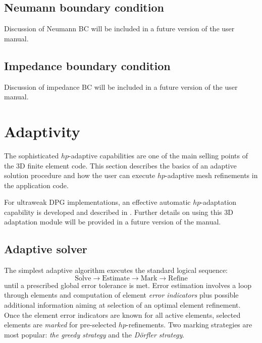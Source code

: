 \subsection{Neumann boundary condition}
\label{sec:impedance}

Discussion of Neumann BC will be included in a future version of the user manual.

\subsection{Impedance boundary condition}
\label{sec:impedance}

Discussion of impedance BC will be included in a future version of the user manual.

\section{Adaptivity}
\label{sec:adaptivity}

The sophisticated $hp$-adaptive capabilities are one of the main selling points of the \hp3D finite element code. This section describes the basics of an adaptive solution procedure and how the user can execute $hp$-adaptive mesh refinements in the application code.

For ultraweak DPG implementations, an effective automatic $hp$-adaptation capability is developed and described in \cite{chakraborty2023hp}. Further details on using this \hp3D adaptation module will be provided in a future version of the manual.

\subsection{Adaptive solver}
\label{sec:adaptive-solver}

The simplest adaptive algorithm executes the standard logical sequence:
\[
	\text{Solve} \longrightarrow
	\text{Estimate} \longrightarrow
	\text{Mark} \longrightarrow
	\text{Refine} 
\]
until a prescribed global error tolerance is met. Error estimation involves a loop through elements and computation of element {\em error indicators} plus possible additional information aiming at selection of an optimal element refinement. Once the element error indicators are known for all active elements, selected elements are {\em marked} for pre-selected $hp$-refinements. Two marking strategies are most popular: {\em the greedy strategy} and the {\em D\"orfler strategy}. 

